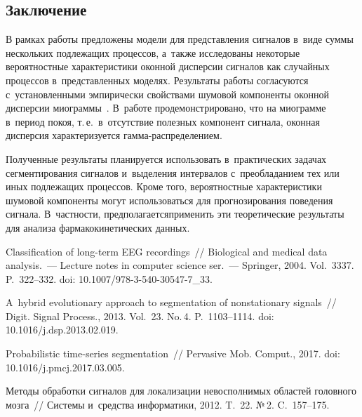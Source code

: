 \begin{multicols}{2}
\section{Заключение}

В рамках работы предложены модели для представления сигналов в~виде суммы нескольких 
подлежащих процессов, а~также исследованы некоторые вероятностные характеристики 
оконной диспер\-сии сигналов как случайных процессов в~представленных моделях. 
Результаты работы согласуются с~установленными эмпирически свойствами шумовой 
компоненты оконной дисперсии миограммы~\cite{All}.  В~работе продемонстрировано, 
что на миограмме в~период покоя, т.\,е.\ в~отсутствие полезных компонент сигнала, 
оконная дисперсия характеризуется гам\-ма-рас\-пре\-де\-ле\-нием.

Полученные результаты планируется использовать в~практических задачах 
сегментирования сигналов и~выделения интервалов с~преобладанием тех или 
иных подлежащих процессов. Кроме того, вероятностные характеристики шумовой 
компоненты могут использоваться для прогнозирования поведения сигнала. 
В~частности, предполагается\linebreak приме\-нить эти теоретические результаты для анализа 
фармакокинетических данных.


   {\small\frenchspacing
 {%
 \begin{thebibliography}{9}
    Classification of long-term EEG recordings~//  Biological
    and medical data analysis.~---
    Lecture notes in computer science ser.~--- Springer, 2004. Vol.~3337. P.~322--332.
    doi: 10.1007/978-3-540-30547-7\_33.
    
    A~hybrid evolutionary approach to segmentation of nonstationary signals~// 
    Digit. Signal Process., 2013. Vol.~23. No.\,4. P.~1103--1114.
    doi: 10.1016/j.dsp.2013.02.019.
    
    Probabilistic time-series segmentation~// Pervasive Mob. Comput., 
 2017. doi: 10.1016/j.pmcj.2017.03.005.
    
    Методы обработки сигналов для локализации невосполнимых областей головного мозга~// 
    Системы и~средства информатики, 2012. T.~22. №\,2. C.~157--175.
    

\end{thebibliography}}}
\end{multicols}
